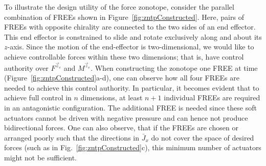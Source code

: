 To illustrate the design utility of the force zonotope, consider the parallel combination of FREEs shown in Figure~\ref{fig:zntpConstructed}.
Here, pairs of FREEs with opposite chirality are connected to the two sides of an end effector.
This end effector is constrained to slide and rotate exclusively along and about its $z$-axis.
Since the motion of the end-effector is two-dimensional, we would like to achieve controllable forces within these two dimensions; that is, have control authority over $F^{\vec{z}_e}$ and $M^{\vec{z}_e}$.
When constructing the zonotope one FREE at time (Figure~\ref{fig:zntpConstructed}a-d), one can observe how all four FREEs are needed to achieve this control authority.
In particular, it becomes evident that to achieve full control in $n$ dimensions, at least $n+1$ individual FREEs are required in an antagonistic configuration.
The additional FREE is needed since these soft actuators cannot be driven with negative pressure and can hence not produce bidirectional forces.
One can also observe, that if the FREEs are chosen or arranged poorly such that the directions in $\bar{J}_{x}$ do not cover the space of desired forces (such as in Fig.~\ref{fig:zntpConstructed}c), this minimum number of actuators might not be sufficient.
























